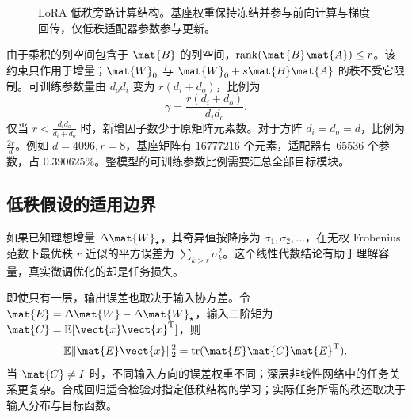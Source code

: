 \documentclass[../textbook.tex]{subfiles}
\begin{document}
\begin{figure}[htbp]
\centering
{}
\caption[LoRA 低秩旁路计算结构]{LoRA 低秩旁路计算结构。基座权重保持冻结并参与前向计算与梯度回传，仅低秩适配器参数参与更新。}\label{fig:peft-lora-arch}
\end{figure}

由于乘积的列空间包含于 $\mat{B}$ 的列空间，$\operatorname{rank}(\mat{B}\mat{A})\le r$。该约束只作用于增量；$\mat{W}_0$ 与 $\mat{W}_0+s\mat{B}\mat{A}$ 的秩不受它限制。可训练参数量由 $d_od_i$ 变为 $r(d_i+d_o)$，比例为
\begin{equation}
\gamma=\frac{r(d_i+d_o)}{d_id_o}.
\end{equation}
仅当 $r<\frac{d_id_o}{d_i+d_o}$ 时，新增因子数少于原矩阵元素数。对于方阵 $d_i=d_o=d$，比例为 $\frac{2r}{d}$。例如 $d=4096,r=8$，基座矩阵有 $16777216$ 个元素，适配器有 $65536$ 个参数，占 $0.390625\%$。整模型的可训练参数比例需要汇总全部目标模块。

\subsection{低秩假设的适用边界}
如果已知理想增量 $\Delta \mat{W}_\star$，其奇异值按降序为 $\sigma_1,\sigma_2,\ldots$，在无权 Frobenius 范数下最优秩 $r$ 近似的平方误差为 $\sum_{k>r}\sigma_k^2$。这个线性代数结论有助于理解容量，真实微调优化的却是任务损失。

即使只有一层，输出误差也取决于输入协方差。令 $\mat{E}=\Delta \mat{W}-\Delta \mat{W}_\star$，输入二阶矩为 $\mat{C}=\mathbb E[\vect{x}\vect{x}^{\mathrm{T}}]$，则
\begin{equation}
\mathbb E\|\mat{E}\vect{x}\|_2^2=\operatorname{tr}(\mat{E}\mat{C}\mat{E}^{\mathrm{T}}).
\end{equation}
当 $\mat{C}\ne I$ 时，不同输入方向的误差权重不同；深层非线性网络中的任务关系更复杂。合成回归适合检验对指定低秩结构的学习；实际任务所需的秩还取决于输入分布与目标函数。
\end{document}
